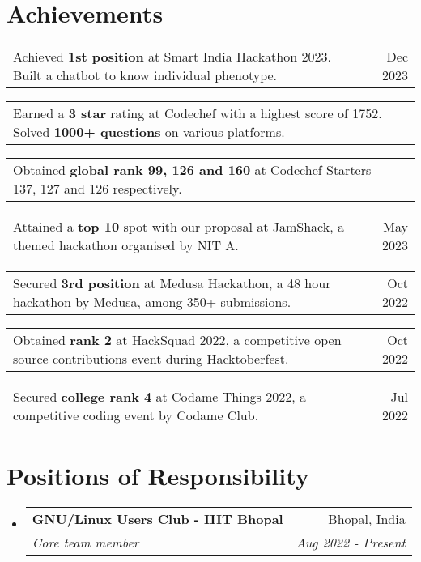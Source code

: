 \documentclass[a4paper,20pt]{article}
\makeatletter
\newcommand{\resumeSubheading}[4]{
  \vspace{-1pt}\item
    \begin{tabular*}{0.97\textwidth}{l@{\extracolsep{\fill}}r}
      \textbf{#1} & #2 \\
      \textit{#3} & \textit{#4} \\
    \end{tabular*}\vspace{-5pt}
}
\newcommand{\resumeSmallSubheading}[2]{
  \vspace{-1pt}\item
    \begin{tabular*}{0.97\textwidth}{l@{\extracolsep{\fill}}r}
      #1 & #2 \\
    \end{tabular*}\vspace{-8pt}
}
\newcommand{\resumeSubHeadingListStart}{\begin{itemize}[label={}, leftmargin=*]}
\newcommand{\resumeSubHeadingListEnd}{\end{itemize}}
\makeatother
\begin{document}
\section{Achievements}
\begin{description}[font=$\bullet$]
  \resumeSmallSubheading{Achieved \textbf{1st position} at Smart India Hackathon 2023. Built a chatbot to know individual phenotype.}{Dec 2023}
  \vspace{-10pt}
  \resumeSmallSubheading{Earned a \textbf{3 star} rating at Codechef with a highest score of 1752. Solved \textbf{1000+ questions} on various platforms.}{}
  \vspace{-10pt}
  \resumeSmallSubheading{Obtained \textbf{global rank 99, 126 and 160} at Codechef Starters 137, 127 and 126 respectively.}{}
  \vspace{-10pt}
  \resumeSmallSubheading{Attained a \textbf{top 10} spot with our proposal at JamShack, a themed hackathon organised by NIT A.}{May 2023}
  \vspace{-10pt}
  \resumeSmallSubheading{Secured \textbf{3rd position} at Medusa Hackathon, a 48 hour hackathon by Medusa, among 350+ submissions.}{Oct 2022}
  \vspace{-10pt}
  \resumeSmallSubheading{Obtained \textbf{rank 2} at HackSquad 2022, a competitive open source contributions event during Hacktoberfest.} {Oct 2022}
  \vspace{-10pt}
  \resumeSmallSubheading{Secured \textbf{college rank 4} at Codame Things 2022, a competitive coding event by Codame Club.}{Jul 2022}
  \vspace{-10pt}
\end{description}

\vspace{-2pt}
\section{Positions of Responsibility}
\resumeSubHeadingListStart
    \resumeSubheading
    {GNU/Linux Users Club - IIIT Bhopal}{Bhopal, India}
    {Core team member}{Aug 2022 - Present}

\resumeSubHeadingListEnd
\end{document}
